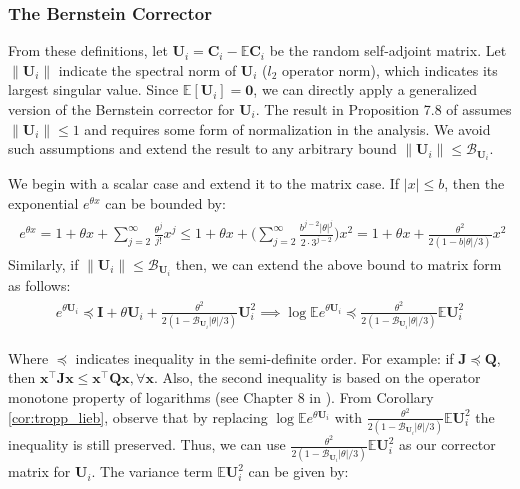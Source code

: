 \documentclass{article}
\newcommand{\norm}[1]{\left\lVert#1\right\rVert}
\def\mC{{\mathbf{C}}}
\def\mI{{\mathbf{I}}}
\def\mJ{{\mathbf{J}}}
\def\mQ{{\mathbf{Q}}}
\def\mU{{\mathbf{U}}}
\def\vzero{{\mathbf{0}}}
\def\vx{{\mathbf{x}}}
\theoremstyle{plain}
\theoremstyle{definition}
\theoremstyle{remark}
\begin{document}
\subsubsection{The Bernstein Corrector}

From these definitions, let $\mU_i = \mC_i - \mathbb{E}\mC_i$ be the random self-adjoint matrix. Let $\norm{\mU_i}$ indicate the spectral norm of $\mU_i$ ($l_2$ operator norm), which indicates its largest singular value. Since $\mathbb{E}[\mU_i] = \vzero$, we can directly apply a generalized version of the Bernstein corrector for $\mU_i$. The result in Proposition 7.8 of \citet{tropp2019matrix} assumes $\norm{\mU_i} \le 1$ and requires some form of normalization in the analysis. We avoid such assumptions and extend the result to any arbitrary bound $\norm{\mU_i} \le \mathcal{B}_{\mU_i}$. 

We begin with a scalar case and extend it to the matrix case. If $|x| \le b$, then the exponential $e^{\theta x}$ can be bounded by:
\begin{align*}
\begin{split}
    e^{\theta x} = 1 + \theta x + \sum_{j=2}^\infty \frac{\theta^j}{j!}x^j \le 1 + \theta x + \bigg( \sum_{j=2}^\infty \frac{b^{j-2}|\theta|^j}{2\cdot 3^{j-2}} \bigg) x^2 = 1 + \theta x + \frac{\theta^2}{2 (1 - b|\theta|/3)}x^2
\end{split}
\end{align*}
Similarly, if $\norm{\mU_i} \le \mathcal{B}_{\mU_i}$ then, we can extend the above bound to matrix form as follows:
\begin{align*}
\begin{split}
    e^{\theta \mU_i} \preccurlyeq  \mI + \theta \mU_i + \frac{\theta^2}{2 (1 - \mathcal{B}_{\mU_i}|\theta|/3)}\mU_i^2 
    \implies \log \mathbb{E}e^{\theta \mU_i}  \preccurlyeq \frac{\theta^2}{2 (1 - \mathcal{B}_{\mU_i}|\theta|/3)}\mathbb{E}\mU_i^2
\end{split}
\end{align*}

Where $\preccurlyeq$ indicates inequality in the semi-definite order. For example: if $\mJ \preccurlyeq \mQ$, then $\vx^\top \mJ\vx \le \vx^\top \mQ \vx, \forall \vx $. Also, the second inequality is based on the operator monotone property of logarithms (see Chapter 8 in \citet{tropp2015introduction}). From Corollary \ref{cor:tropp_lieb}, observe that by replacing $\log \mathbb{E}e^{\theta \mU_i}$ with $\frac{\theta^2}{2 (1 - \mathcal{B}_{\mU_i}|\theta|/3)}\mathbb{E}\mU_i^2$ the inequality is still preserved. Thus, we can use $\frac{\theta^2}{2 (1 - \mathcal{B}_{\mU_i}|\theta|/3)}\mathbb{E}\mU_i^2$ as our corrector matrix for $\mU_i$. The variance term $\mathbb{E}\mU_i^2$ can be given by:
\end{document}
